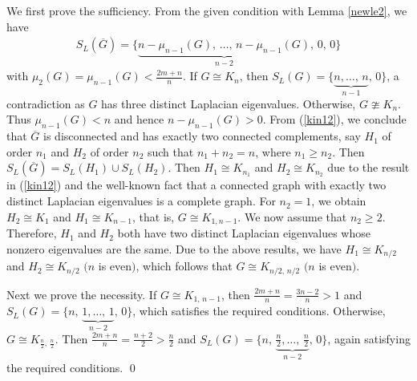\documentclass[12pt]{article}
\newenvironment{pf}{\medskip\noindent{Proof:  \hspace*{-.4cm}}
       \enspace}{\hfill \qed \newline \medskip}
\begin{document}
\begin{pf}
 We first prove the sufficiency. From the given condition with Lemma \ref{newle2}, we have
 \begin{align}
    S_L(\overline{G})=\Big\{\underbrace{n-\mu_{n-1}(G),\,\ldots,\,n-\mu_{n-1}(G)}_{n-2},\,0,\,0\Big\}\label{kin12}
 \end{align}
 with $\mu_2(G)=\mu_{n-1}(G)<\frac{2m+n}{n}$. If $G\cong K_n$, then $S_L(G)=\Big\{\underbrace{n,\ldots,\,n}_{n-1},\,0\Big\}$, a contradiction as $G$ has three distinct Laplacian eigenvalues. Otherwise, $G\ncong K_n$. Thus
 $\mu_{n-1}(G)<n$ and hence $n-\mu_{n-1}(G)>0$. From (\ref{kin12}), we conclude that $\overline{G}$ is disconnected and has exactly two connected
 complements, say $H_1$ of order $n_1$  and $H_2$ of order $n_2$ such
 that $n_1+n_2=n$, where $n_1\geq n_2$. Then
 $S_L(\overline{G})=S_L(H_1)\cup S_L(H_2)$. Then $H_1\cong K_{n_1}$
 and $H_2\cong K_{n_2}$ due to the result in (\ref{kin12}) and the well-known fact that a connected graph with exactly two distinct
 Laplacian eigenvalues is a complete graph. For $n_2=1$, we obtain $H_2\cong K_1$ and $H_1\cong K_{n-1}$, that is, $G\cong K_{1,n-1}$.
 We now assume that $n_2\geq 2$. Therefore, $H_1$ and $H_2$ both have two distinct Laplacian eigenvalues whose nonzero eigenvalues are the same.
 Due to the above results, we have $H_1\cong K_{n/2}$ and $H_2\cong K_{n/2}$ $(n$ is even$)$, which follows that $G\cong K_{n/2,\,n/2}$ $(n$ is even$)$.

 Next we prove the necessity. If $G\cong K_{1,\,n-1}$, then $\frac{2m+n}{n}=\frac{3n-2}{n}>1$
 and $S_L(G)=\Big\{n,\,\underbrace{1,\ldots,\,1}_{n-2},\,0\Big\}$, which
 satisfies the required conditions. Otherwise, $G\cong
 K_{\frac{n}{2},\,\frac{n}{2}}$.  Then $\frac{2m+n}{n}=\frac{n+2}{2}>\frac{n}{2}$
 and $S_L(G)=\Big\{n,\,\underbrace{\frac{n}{2},\ldots,\,\frac{n}{2}}_{n-2},\,0\Big\}$,
 again satisfying the required conditions.
\end{pf}
\end{document}
